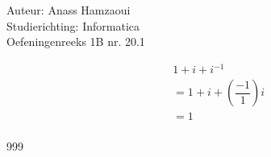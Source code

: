 \documentclass[a4paper]{article}
\begin{document}
  
\noindent \large Auteur: Anass Hamzaoui \\
\noindent \large Studierichting: Informatica \\
\noindent \large Oefeningenreeks 1B nr. 20.1 \\

\medskip

\normalsize

\begin{eqnarray*}
    && 1 + i + i^{-1} \\
    && = 1 + i + \left(\dfrac{-1}{1}\right)i \\
    && = 1 \\
\end{eqnarray*}

\begin{thebibliography}{999}
\end{thebibliography}
\end{document}
